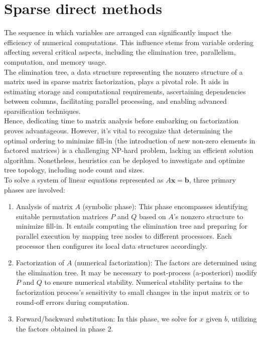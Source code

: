 \documentclass[11pt]{book}
\begin{document}
\section*{Sparse direct methods}
The sequence in which variables are arranged can significantly impact the efficiency of numerical computations. This influence stems from variable ordering affecting several critical aspects, including the elimination tree, parallelism, computation, and memory usage.  \\
The elimination tree, a data structure representing the nonzero structure of a matrix used in sparse matrix factorization, plays a pivotal role. It aids in estimating storage and computational requirements, ascertaining dependencies between columns, facilitating parallel processing, and enabling advanced sparsification techniques.  \\
Hence, dedicating time to matrix analysis before embarking on factorization proves advantageous. However, it's vital to recognize that determining the optimal ordering to minimize fill-in (the introduction of new non-zero elements in factored matrices) is a challenging NP-hard problem, lacking an efficient solution algorithm. Nonetheless, heuristics can be deployed to investigate and optimize tree topology, including node count and sizes.  \\
To solve a system of linear equations represented as $A\mathbf{x}=\mathbf{b}$, three primary phases are involved:  
\begin{enumerate}  
\item Analysis of matrix $A$ (symbolic phase): This phase encompasses identifying suitable permutation matrices $P$ and $Q$ based on $A$'s nonzero structure to minimize fill-in. It entails computing the elimination tree and preparing for parallel execution by mapping tree nodes to different processors. Each processor then configures its local data structures accordingly.  
\item Factorization of $A$ (numerical factorization): The factors are determined using the elimination tree. It may be necessary to post-process (a-posteriori) modify $P$ and $Q$ to ensure numerical stability. Numerical stability pertains to the factorization process's sensitivity to small changes in the input matrix or to round-off errors during computation.  
\item Forward/backward substitution: In this phase, we solve for $x$ given $b$, utilizing the factors obtained in phase 2.  
\end{enumerate}  
  
\end{document}
